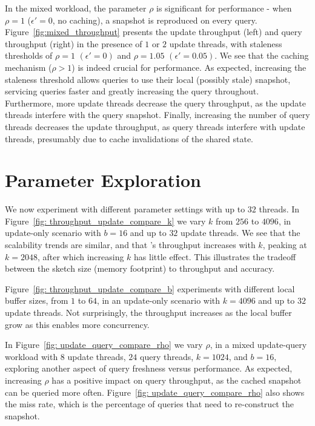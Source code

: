 In the mixed workload, the parameter $\rho$ is significant for performance - when $\rho = 1$ ($\epsilon'=0$, no caching), a snapshot is reproduced on every query.
Figure~\ref{fig:mixed_throughput} presents the update throughput (left) and query throughput (right) in the presence of $1$ or $2$ update threads, with staleness thresholds of $\rho=1$ $(\epsilon'=0)$ and $\rho=1.05$ $(\epsilon'=0.05)$. We see that the caching mechanism ($\rho > 1$) is indeed crucial for performance. As expected, increasing the staleness threshold allows queries to use their local (possibly stale) snapshot, servicing queries faster and greatly increasing the query throughout. Furthermore, more update threads decrease the query throughput, as the update threads interfere with the query snapshot. 
Finally, increasing the number of query threads decreases the update throughput, as query threads interfere with update threads, presumably due to cache invalidations of the shared state.


\section{Parameter Exploration}
\label{sec:params} 
We now experiment with different parameter settings with up to $32$ threads. 
In  Figure~\ref{fig: throughput_update_compare_k} we vary $k$ from $256$ to $4096$, in update-only scenario with $b = 16$ and up to $32$ update threads.
We see that the scalability trends are similar, and that \mysketch's throughput increases with $k$, peaking at $k = 2048$, after which increasing $k$ has little effect.
This illustrates the tradeoff between the sketch size (memory footprint) to  throughput and accuracy. 


Figure~\ref{fig: throughput_update_compare_b} experiments with different local buffer sizes, from $1$ to $64$, in an update-only scenario with $k = 4096$ and up to $32$ update threads. Not surprisingly, the throughput increases as the local buffer grow as this enables more concurrency. 


In Figure~\ref{fig: update_query_compare_rho} we vary $\rho$, in a mixed update-query workload with $8$ update threads, $24$ query threads, $k = 1024$, and $b = 16$, exploring another aspect of query freshness versus performance. As expected, increasing  $\rho$ has a positive impact on query throughput, as the cached snapshot can be queried more often.  Figure~\ref{fig: update_query_compare_rho} also shows the miss rate, which is the percentage of queries that need to re-construct the snapshot.


